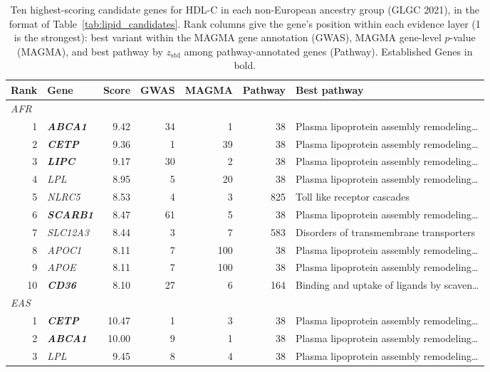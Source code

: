 \begin{table}[!t]
\centering
\caption{Ten highest-scoring candidate genes for HDL-C in each non-European ancestry group (GLGC 2021), in the format of Table~\ref{tab:lipid_candidates}. Rank columns give the gene's position within each evidence layer (1 is the strongest): best variant within the MAGMA gene annotation (GWAS), MAGMA gene-level $p$-value (MAGMA), and best pathway by $z_{\mathrm{std}}$ among pathway-annotated genes (Pathway). Established Genes in bold.}
\label{tab:replication_candidates_hdl}
\footnotesize
\begin{tabular}{rlrrrrl}
\hline
\textbf{Rank} & \textbf{Gene} & \textbf{Score} & \textbf{GWAS} & \textbf{MAGMA} & \textbf{Pathway} & \textbf{Best pathway} \\
\hline
\multicolumn{7}{l}{\textit{AFR}} \\
1 & \textbf{\textit{ABCA1}} & 9.42 & 34 & 1 & 38 & Plasma lipoprotein assembly remodeling\ldots \\
2 & \textbf{\textit{CETP}} & 9.36 & 1 & 39 & 38 & Plasma lipoprotein assembly remodeling\ldots \\
3 & \textbf{\textit{LIPC}} & 9.17 & 30 & 2 & 38 & Plasma lipoprotein assembly remodeling\ldots \\
4 & \textit{LPL} & 8.95 & 5 & 20 & 38 & Plasma lipoprotein assembly remodeling\ldots \\
5 & \textit{NLRC5} & 8.53 & 4 & 3 & 825 & Toll like receptor cascades \\
6 & \textbf{\textit{SCARB1}} & 8.47 & 61 & 5 & 38 & Plasma lipoprotein assembly remodeling\ldots \\
7 & \textit{SLC12A3} & 8.44 & 3 & 7 & 583 & Disorders of transmembrane transporters \\
8 & \textit{APOC1} & 8.11 & 7 & 100 & 38 & Plasma lipoprotein assembly remodeling\ldots \\
9 & \textit{APOE} & 8.11 & 7 & 100 & 38 & Plasma lipoprotein assembly remodeling\ldots \\
10 & \textbf{\textit{CD36}} & 8.10 & 27 & 6 & 164 & Binding and uptake of ligands by scaven\ldots \\
\multicolumn{7}{l}{\textit{EAS}} \\
1 & \textbf{\textit{CETP}} & 10.47 & 1 & 3 & 38 & Plasma lipoprotein assembly remodeling\ldots \\
2 & \textbf{\textit{ABCA1}} & 10.00 & 9 & 1 & 38 & Plasma lipoprotein assembly remodeling\ldots \\
3 & \textit{LPL} & 9.45 & 8 & 4 & 38 & Plasma lipoprotein assembly remodeling\ldots \\

\end{tabular}
\end{table}
